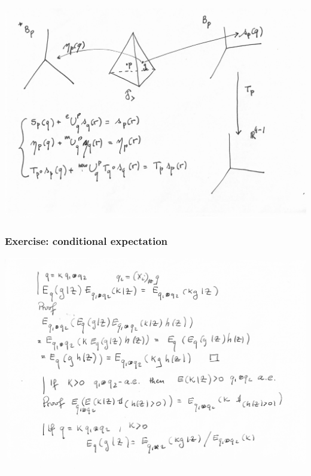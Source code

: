 \documentclass[xcolor=svgnames]{beamer}
\begin{document}
\begin{frame}[plain]

  \includegraphics[height=.8\textheight]{exercise/scheme.pdf}
  
\end{frame}

\begin{frame}[plain]\frametitle{Exercise: conditional expectation}

\includegraphics[width=\textwidth]{exercise/bayes-conditional-expectation.pdf}

\end{frame}
\end{document}
